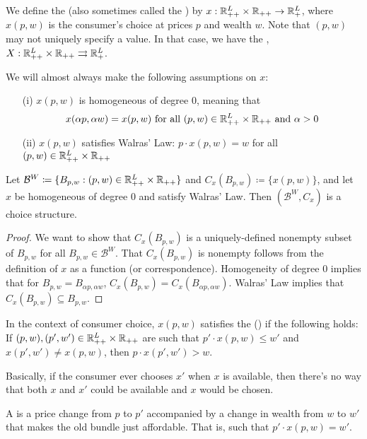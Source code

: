 \documentclass[12pt]{article}
\begin{document}
\begin{definition}
	We define the  (also sometimes called the ) by $x : \mathbb{R}^L_{++} \times \mathbb{R}_{++} \to \mathbb{R}^L_+$, where $x(p,w)$ is the consumer's choice at prices $p$ and wealth $w$. Note that $(p,w)$ may not uniquely specify a value. In that case, we have the , $X: \mathbb{R}^L_{++} \times \mathbb{R}_{++} \rightrightarrows \mathbb{R}^L_+$.
\end{definition}

\begin{assumption}\label{ass:demand_assumptions}
We will almost always make the following assumptions on $x$:
\begin{itemize}
	\item[(i)] $x(p,w)$ is homogeneous of degree 0, meaning that
	\[
	x(\alpha p ,\alpha w) = x(p,w) \text{ for all } (p,w) \in \mathbb{R}^L_{++} \times \mathbb{R}_{++} \text{ and } \alpha > 0
	\]
	\item[(ii)] $x(p,w)$ satisfies Walras' Law: $p \cdot x(p,w) = w$ for all $(p,w) \in \mathbb{R}^L_{++} \times \mathbb{R}_{++}$
\end{itemize}
\end{assumption}
\begin{proposition}\label{prop:walras_law_choice_structure}
	Let $\mathcal{B}^W \coloneqq \{B_{p,w} : (p,w) \in \mathbb{R}^L_{++} \times \mathbb{R}_{++}\}$ and $C_x(B_{p,w}) \coloneqq \{x(p,w)\}$, and let $x$ be homogeneous of degree 0 and satisfy Walras' Law. Then $(\mathcal{B}^W,C_x)$ is a choice structure.
\end{proposition}
\begin{proof}
	We want to show that $C_x(B_{p,w})$ is a uniquely-defined nonempty subset of $B_{p,w}$ for all $B_{p,w} \in \mathcal{B}^W$. That $C_x(B_{p,w})$ is nonempty follows from the definition of $x$ as a function (or correspondence). Homogeneity of degree 0 implies that for $B_{p,w} = B_{\alpha p,\alpha w}$, $C_x(B_{p,w}) = C_x(B_{\alpha p,\alpha w})$. Walras' Law implies that $C_x(B_{p,w}) \subseteq B_{p,w}$.
\end{proof}

\begin{definition}
	In the context of consumer choice, $x(p,w)$ satisfies the  () if the following holds: If $(p,w),(p',w') \in \mathbb{R}^L_{++} \times \mathbb{R}_{++}$ are such that $p' \cdot x(p,w) \le w'$ and $x(p',w') \ne x(p,w)$, then $p\cdot x(p',w') > w$.
\end{definition}
\begin{remark}
	Basically, if the consumer ever chooses $x'$ when $x$ is available, then there's no way that both $x$ and $x'$ could be available and $x$ would be chosen.
\end{remark}
\begin{definition}
	A  is a price change from $p$ to $p'$ accompanied by a change in wealth from $w$ to $w'$ that makes the old bundle just affordable. That is, such that $p' \cdot x(p,w) = w'$.
\end{definition}
\end{document}
